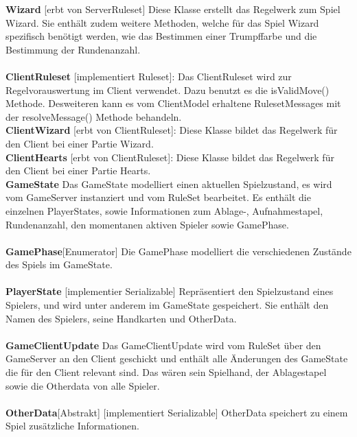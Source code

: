 \documentclass{article}
\begin{document}
\textbf{Wizard} [erbt von ServerRuleset] Diese Klasse erstellt das Regelwerk zum Spiel Wizard. Sie enthält zudem weitere Methoden, welche für das Spiel Wizard spezifisch benötigt werden, wie das Bestimmen einer Trumpffarbe und die Bestimmung der Rundenanzahl. \\ \\
		
\textbf{ClientRuleset} [implementiert Ruleset]:  Das ClientRuleset wird zur Regelvorauswertung im Client verwendet. Dazu benutzt es die isValidMove() Methode. Desweiteren kann es vom ClientModel erhaltene RulesetMessages mit der resolveMessage() Methode behandeln.  \\

\textbf{ClientWizard} [erbt von ClientRuleset]: Diese Klasse bildet das Regelwerk für den Client bei einer Partie Wizard. \\

\textbf{ClientHearts} [erbt von ClientRuleset]: Diese Klasse bildet das Regelwerk für den Client bei einer Partie Hearts. \\
		
\textbf{GameState} Das GameState modelliert einen aktuellen Spielzustand, es wird vom GameServer instanziert und vom RuleSet bearbeitet. Es enthält die einzelnen PlayerStates, sowie Informationen zum Ablage-, Aufnahmestapel, Rundenanzahl, den momentanen aktiven Spieler sowie GamePhase. \\ \\
		
\textbf{GamePhase}[Enumerator] Die GamePhase modelliert die verschiedenen Zustände des Spiels im GameState. \\ \\
		
\textbf{PlayerState} [implementier Serializable] Repräsentiert den Spielzustand eines Spielers, und wird unter anderem im GameState gespeichert. Sie enthält den Namen des Spielers, seine Handkarten und OtherData. \\ \\
		
\textbf{GameClientUpdate} Das GameClientUpdate wird vom RuleSet über den GameServer an den Client geschickt und enthält alle Änderungen des GameState die für den Client relevant sind. Das wären sein Spielhand, der Ablagestapel sowie die Otherdata  von alle Spieler. \\ \\
		
\textbf{OtherData}[Abstrakt] [implementiert Serializable] OtherData speichert zu einem Spiel zusätzliche Informationen. \\ \\
		
\end{document}
